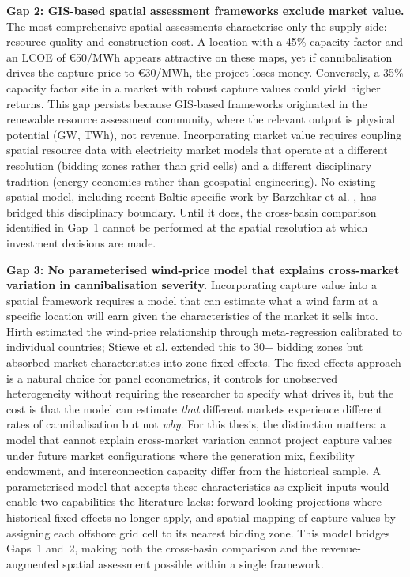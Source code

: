 \textbf{Gap 2: GIS-based spatial assessment frameworks exclude market value.} The most comprehensive spatial assessments \cite{Bosch2017, Bosch2018, Bosch2019, Chu2020} characterise only the supply side: resource quality and construction cost. A location with a 45\% capacity factor and an LCOE of \euro{}50/MWh appears attractive on these maps, yet if cannibalisation drives the capture price to \euro{}30/MWh, the project loses money. Conversely, a 35\% capacity factor site in a market with robust capture values could yield higher returns. This gap persists because GIS-based frameworks originated in the renewable resource assessment community, where the relevant output is physical potential (GW, TWh), not revenue. Incorporating market value requires coupling spatial resource data with electricity market models that operate at a different resolution (bidding zones rather than grid cells) and a different disciplinary tradition (energy economics rather than geospatial engineering). No existing spatial model, including recent Baltic-specific work by Barzehkar et al. \cite{Barzehkar2024}, has bridged this disciplinary boundary. Until it does, the cross-basin comparison identified in Gap~1 cannot be performed at the spatial resolution at which investment decisions are made.

\vspace{4pt}

\textbf{Gap 3: No parameterised wind-price model that explains cross-market variation in cannibalisation severity.} Incorporating capture value into a spatial framework requires a model that can estimate what a wind farm at a specific location will earn given the characteristics of the market it sells into. Hirth \cite{Hirth2013} estimated the wind-price relationship through meta-regression calibrated to individual countries; Stiewe et al. \cite{Stiewe2025} extended this to 30+ bidding zones but absorbed market characteristics into zone fixed effects. The fixed-effects approach is a natural choice for panel econometrics, it controls for unobserved heterogeneity without requiring the researcher to specify what drives it, but the cost is that the model can estimate \textit{that} different markets experience different rates of cannibalisation but not \textit{why}. For this thesis, the distinction matters: a model that cannot explain cross-market variation cannot project capture values under future market configurations where the generation mix, flexibility endowment, and interconnection capacity differ from the historical sample. A parameterised model that accepts these characteristics as explicit inputs would enable two capabilities the literature lacks: forward-looking projections where historical fixed effects no longer apply, and spatial mapping of capture values by assigning each offshore grid cell to its nearest bidding zone. This model bridges Gaps~1 and~2, making both the cross-basin comparison and the revenue-augmented spatial assessment possible within a single framework.

